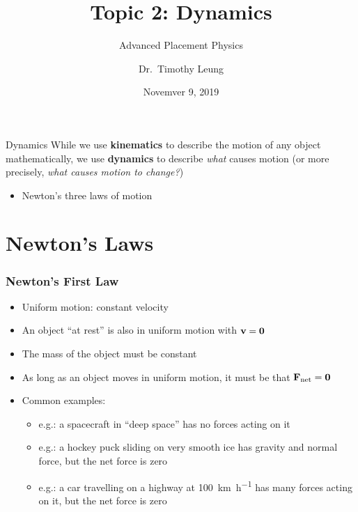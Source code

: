 \documentclass[12pt,compress,aspectratio=169]{beamer}
\title{Topic 2: Dynamics}
\subtitle{Advanced Placement Physics}
\author[TML]{Dr.\ Timothy Leung}
\institute{Olympiads School}
\date{Novemver 9, 2019}
\newcommand{\mb}[1]{\ensuremath\mathbf{#1}}
\begin{document}
\begin{frame}
  \maketitle
\end{frame}

\begin{frame}{Dynamics}
  While we use \textbf{kinematics} to describe the motion of any object
  mathematically, we use \textbf{dynamics} to describe \emph{what} causes
  motion (or more precisely, \emph{what causes motion to change?})
  \begin{itemize}
  \item Newton's three laws of motion
  \end{itemize}
\end{frame}



\section{Newton's Laws}

\begin{frame}
  \frametitle{Newton's First Law}
  \begin{center}
  \end{center}

  \vspace{.3in}
  \begin{itemize}
  \item Uniform motion: constant velocity
  \item An object ``at rest'' is also in uniform motion with $\mb{v}=\mb{0}$
  \item \textcolor{red!80!black}{The mass of the object must be constant}
  \item As long as an object moves in uniform motion, it must be that
    $\mb{F}_\mathrm{net}=\mb{0}$
  \item Common examples:
    \begin{itemize}
    \item e.g.: a spacecraft in ``deep space'' has no forces acting on it
    \item e.g.: a hockey puck sliding on very smooth ice has gravity and normal
      force, but the net force is zero
    \item e.g.: a car travelling on a highway at \SI{100}{\kilo\metre\per\hour}
      has many forces acting on it, but the net force is zero 
    \end{itemize}
  \end{itemize}
\end{frame}
\end{document}
